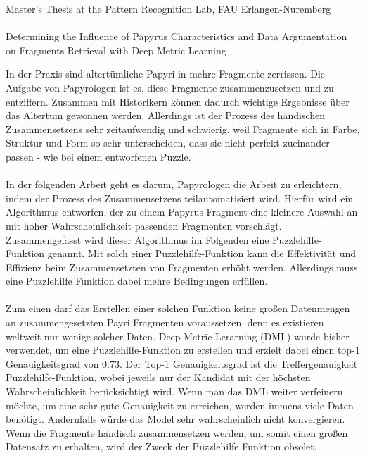 \documentclass[12pt,a4paper]{article}
\begin{document}
\begin{center}
	Master's Thesis at the Pattern Recognition Lab, FAU Erlangen-Nuremberg \hfill \\[5mm]
																				
	\mbox{}\\
	{\Large Determining the Influence of Papyrus Characteristics and Data Argumentation on Fragments Retrieval with Deep Metric Learning}
			
\end{center}


In der Praxis sind altertümliche Papyri in mehre Fragmente zerrissen. 
Die Aufgabe von Papyrologen ist es, diese Fragmente zusammenzusetzen und zu entziffern. Zusammen mit Historikern können dadurch wichtige Ergebnisse über das Altertum gewonnen werden. Allerdings ist der Prozess des händischen Zusammensetzens sehr zeitaufwendig und schwierig, weil Fragmente sich in Farbe, Struktur und Form so sehr unterscheiden, dass sie nicht perfekt zueinander passen - wie bei einem entworfenen Puzzle. 
\\\\
In der folgenden Arbeit geht es darum, Papyrologen die Arbeit zu erleichtern, indem der Prozess des Zusammensetzens teilautomatisiert wird. 
Hierfür wird ein Algorithmus entworfen, der zu einem Papyrus-Fragment eine kleinere Auswahl an mit hoher Wahrscheinlichkeit passenden Fragmenten vorschlägt. 
Zusammengefasst wird dieser Algorithmus im Folgenden eine Puzzlehilfe-Funktion genannt.
Mit solch einer Puzzlehilfe-Funktion kann die Effektivität und Effizienz beim Zusammensetzten von Fragmenten erhöht werden. 
Allerdings muss eine Puzzlehilfe Funktion dabei mehre Bedingungen erfüllen.
\\\\
Zum einen darf das Erstellen einer solchen Funktion keine großen Datenmengen an zusammengesetzten Payri Fragmenten voraussetzen, denn es existieren weltweit nur wenige solcher Daten. Deep Metric Lerarning (DML) wurde bisher verwendet, um eine Puzzlehilfe-Funktion zu erstellen und erzielt dabei einen top-1 Genauigkeitsgrad von 0.73. Der Top-1 Genauigkeitsgrad ist die Treffergenauigkeit Puzzlehilfe-Funktion, wobei jeweils nur der Kandidat mit der höchsten Wahrscheinlichkeit berücksichtigt wird. 
Wenn man das DML weiter verfeinern möchte, um eine sehr gute Genauigkeit zu erreichen, werden immens viele Daten benötigt. Andernfalls würde das Model sehr wahrscheinlich nicht konvergieren. Wenn die Fragmente händisch zusammensetzen werden, um somit einen großen Datensatz zu erhalten, wird der Zweck der Puzzlehilfe Funktion obsolet.
\end{document}
